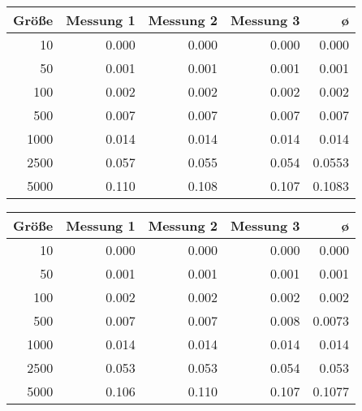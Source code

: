 \documentclass[a4paper, 10pt, twoside, onecolumn, parskip]{scrartcl}
\begin{document}
    \begin{center}
        \begin{tabular}{|r|r|r|r|r|}
            \hline
            Größe & Messung 1 & Messung 2 & Messung 3 & ø \\ \hline
            10 & 0.000 & 0.000 & 0.000 & 0.000 \\ \hline
            50 & 0.001 & 0.001 & 0.001 & 0.001 \\ \hline
            100 & 0.002 & 0.002 & 0.002 & 0.002 \\ \hline
            500 & 0.007 & 0.007 & 0.007 & 0.007 \\ \hline
            1000 & 0.014 & 0.014 & 0.014 & 0.014 \\ \hline
            2500 & 0.057 & 0.055 & 0.054 & 0.0553 \\ \hline
            5000 & 0.110 & 0.108 & 0.107 & 0.1083 \\ \hline
        \end{tabular}
    \end{center}

    \begin{center}
        \begin{tabular}{|r|r|r|r|r|}
            \hline
            Größe & Messung 1 & Messung 2 & Messung 3 & ø \\ \hline
            10 & 0.000 & 0.000 & 0.000 & 0.000 \\ \hline
            50 & 0.001 & 0.001 & 0.001 & 0.001 \\ \hline
            100 & 0.002 & 0.002 & 0.002 & 0.002 \\ \hline
            500 & 0.007 & 0.007 & 0.008 & 0.0073 \\ \hline
            1000 & 0.014 & 0.014 & 0.014 & 0.014 \\ \hline
            2500 & 0.053 & 0.053 & 0.054 & 0.053 \\ \hline
            5000 & 0.106 & 0.110 & 0.107 & 0.1077 \\ \hline
        \end{tabular}
    \end{center}
\end{document}
